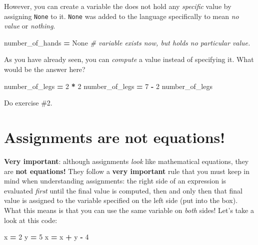 \documentclass[
]{book}
\newenvironment{Shaded}{\begin{snugshade}}{\end{snugshade}}
\newcommand{\CommentTok}[1]{\textcolor[rgb]{0.56,0.35,0.01}{\textit{#1}}}
\newcommand{\DecValTok}[1]{\textcolor[rgb]{0.00,0.00,0.81}{#1}}
\newcommand{\NormalTok}[1]{#1}
\newcommand{\OperatorTok}[1]{\textcolor[rgb]{0.81,0.36,0.00}{\textbf{#1}}}
\newcommand{\VariableTok}[1]{\textcolor[rgb]{0.00,0.00,0.00}{#1}}
\begin{document}
However, you can create a variable the does not hold any \emph{specific} value by assigning \texttt{None} to it. \texttt{None} was added to the language specifically to mean \emph{no value} or \emph{nothing}.

\begin{Shaded}
\begin{Highlighting}[]
\NormalTok{number\_of\_hands }\OperatorTok{=} \VariableTok{None} \CommentTok{\# variable exists now, but holds no particular value.}
\end{Highlighting}
\end{Shaded}

As you have already seen, you can \emph{compute} a value instead of specifying it. What would be the answer here?

\begin{Shaded}
\begin{Highlighting}[]
\NormalTok{number\_of\_legs }\OperatorTok{=} \DecValTok{2} \OperatorTok{*} \DecValTok{2}
\NormalTok{number\_of\_legs }\OperatorTok{=} \DecValTok{7} \OperatorTok{{-}} \DecValTok{2}
\NormalTok{number\_of\_legs}
\end{Highlighting}
\end{Shaded}

Do exercise \#2.

\hypertarget{assignments-are-not-equations}{%
\section{Assignments are not equations!}\label{assignments-are-not-equations}}

\textbf{Very important}: although assignments \emph{look} like mathematical equations, they are \textbf{not equations!} They follow a \textbf{very important} rule that you must keep in mind when understanding assignments: the right side of an expression is evaluated \emph{first} until the final value is computed, then and only then that final value is assigned to the variable specified on the left side (put into the box). What this means is that you can use the same variable on \emph{both} sides! Let's take a look at this code:

\begin{Shaded}
\begin{Highlighting}[]
\NormalTok{x }\OperatorTok{=} \DecValTok{2}
\NormalTok{y }\OperatorTok{=} \DecValTok{5}
\NormalTok{x }\OperatorTok{=}\NormalTok{ x }\OperatorTok{+}\NormalTok{ y }\OperatorTok{{-}} \DecValTok{4}
\end{Highlighting}
\end{Shaded}
\end{document}
